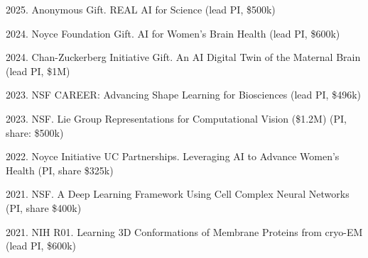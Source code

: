2025. Anonymous Gift. REAL AI for Science \hfill (lead PI, \$500k) 

2024. Noyce Foundation Gift. AI for Women's Brain Health \hfill (lead PI, \$600k) 

2024. Chan-Zuckerberg Initiative Gift. An AI Digital Twin of the Maternal Brain \hfill (lead PI, \$1M) 

2023. NSF CAREER: Advancing Shape Learning for Biosciences \hfill (lead PI, \$496k) 

2023. NSF. Lie Group Representations for Computational Vision (\$1.2M) \hfill (PI, share: \$500k) 

2022. Noyce Initiative UC Partnerships. Leveraging AI to Advance Women’s Health \hfill (PI, share \$325k)

2021. NSF. A Deep Learning Framework Using Cell Complex Neural Networks \hfill (PI, share \$400k)

2021. NIH R01. Learning 3D Conformations of Membrane Proteins from cryo-EM \hfill (lead PI, \$600k) 
